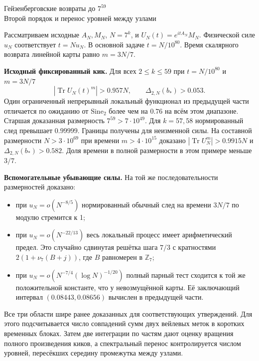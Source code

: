 \documentclass[11pt,a4paper]{article}
\newcommand{\Tr}{\operatorname{Tr}}
\newcommand{\Z}{\mathbb Z}
\newcommand{\si}{\mathrm{Sine}_2}
\begin{document}
\begin{center}{\LARGE\sffamily Гейзенберговские возвраты до $7^{59}$}\\[4pt]
{\large Второй порядок и перенос уровней между узлами}
\end{center}
Рассматриваем исходные $A_N,M_N$, $N=7^k$, и $U_N(t)=e^{itA_N}M_N$. Физической силе $u_N$ соответствует $t=Nu_N$. В основной задаче $t=N/10^{80}$. Время скалярного возврата линейной карты равно $m=3N/7$.

\textbf{Исходный фиксированный кик.} Для всех $2\le k\le59$ при $t=N/10^{80}$ и $m=3N/7$
\[
                 |\Tr U_N(t)^m|>0.957N,\qquad
                         \Delta_{2,N}(b_*)>0.053 .
\]
Один ограниченный непрерывный локальный функционал из предыдущей части отличается по ожиданию от $\si$ более чем на $0.76$ на всём этом диапазоне. Старшая доказанная размерность $7^{59}>7\cdot10^{49}$. Для $k=57,58$ нормированный след превышает $0.99999$. Границы получены для неизменной силы. На составной размерности $N>3\cdot10^{69}$ при времени $m>4\cdot10^{15}$ доказано $|\Tr U_N^m|>0.9915N$ и $\Delta_{2,N}(b_*)>0.582$. Доля времени в полной размерности в этом примере меньше $3/7$.

\textbf{Вспомогательные убывающие силы.} На той же последовательности размерностей доказано:
\begin{itemize}
 \item при $u_N=o(N^{-8/5})$ нормированный обычный след на времени $3N/7$ по модулю стремится к 1;
 \item при $u_N=o(N^{-22/13})$ весь локальный процесс имеет арифметический предел. Это случайно сдвинутая решётка шага $7/3$ с кратностями $2(1+\nu_7(B+j))$, где $B$ равномерен в $\Z_7$;
 \item при $u_N=o(N^{-7/4}(\log N)^{-1/20})$ полный парный тест сходится к той же положительной константе, что у невозмущённой карты. Её заключающий интервал $(0.08443,0.08656)$ вычислен в предыдущей части.
\end{itemize}
Все три области шире ранее доказанных для соответствующих утверждений. Для этого подсчитывается число совпадений сумм двух вейлевых меток в коротких временных блоках. Затем две интеграции по частям дают оценку вращения полного произведения киков, а спектральный перенос контролируется числом уровней, пересёкших середину промежутка между узлами.
\end{document}
